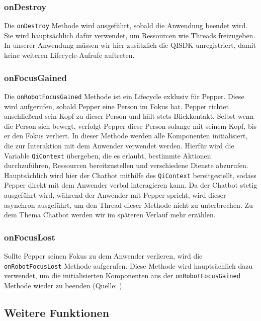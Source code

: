 \subsubsection{onDestroy}

Die \verb|onDestroy| Methode wird ausgeführt, sobald die Anwendung beendet wird. Sie wird hauptsächlich dafür verwendet, um Ressourcen wie Threads freizugeben. In unserer Anwendung müssen wir hier zusätzlich die QISDK unregistriert, damit keine weiteren Lifecycle-Aufrufe auftreten. \\

\subsubsection{onFocusGained}

Die \verb|onRobotFocusGained| Methode ist ein Lifecycle exklusiv für Pepper. Diese wird aufgerufen, sobald Pepper eine Person im Fokus hat. Pepper richtet anschließend sein Kopf zu dieser Person und hält stets Blickkontakt. Selbst wenn die Person sich bewegt, verfolgt Pepper diese Person solange mit seinem Kopf, bis er den Fokus verliert. In dieser Methode werden alle Komponenten initialisiert, die zur Interaktion mit dem Anwender verwendet werden. Hierfür wird die Variable \verb|QiContext| übergeben, die es erlaubt, bestimmte Aktionen durchzuführen, Ressourcen bereitzustellen und verschiedene Dienste abzurufen. Hauptsächlich wird hier der Chatbot mithilfe des \verb|QiContext| bereitgestellt, sodass Pepper direkt mit dem Anwender verbal interagieren kann. Da der Chatbot stetig ausgeführt wird, während der Anwender mit Pepper spricht, wird dieser asynchron ausgeführt, um den Thread dieser Methode nicht zu unterbrechen. Zu dem Thema Chatbot werden wir im späteren Verlauf mehr erzählen. \\

\subsubsection{onFocusLost}
Sollte Pepper seinen Fokus zu dem Anwender verlieren, wird die \verb|onRobotFocusLost| Methode aufgerufen. Diese Methode wird hauptsächlich dazu verwendet, um die initialisierten Komponenten aus der \verb|onRobotFocusGained| Methode wieder zu beenden (Quelle: \cite{Robot_lifecycle}).\\

\subsection{Weitere Funktionen}

